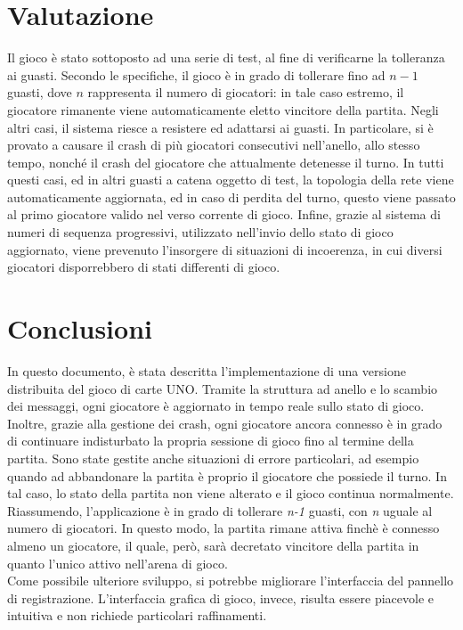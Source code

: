 \documentclass[11pt]{article} %
\begin{document}
\section{Valutazione}
Il gioco è stato sottoposto ad una serie di test, al fine di verificarne la tolleranza ai guasti. Secondo le specifiche, il gioco è in grado di tollerare fino ad \(n-1\) guasti, dove \(n\) rappresenta il numero di giocatori: in tale caso estremo, il giocatore rimanente viene automaticamente eletto vincitore della partita. \newline
Negli altri casi, il sistema riesce a resistere ed adattarsi ai guasti. In particolare, si è provato a causare il crash di più giocatori consecutivi nell'anello, allo stesso tempo, nonché il crash del giocatore che attualmente detenesse il turno. In tutti questi casi, ed in altri guasti a catena oggetto di test, la topologia della rete viene automaticamente aggiornata, ed in caso di perdita del turno, questo viene passato al primo giocatore valido nel verso corrente di gioco. \newline
Infine, grazie al sistema di numeri di sequenza progressivi, utilizzato nell'invio dello stato di gioco aggiornato, viene prevenuto l'insorgere di situazioni di incoerenza, in cui diversi giocatori disporrebbero di stati differenti di gioco.

\section{Conclusioni}
In questo documento, è stata descritta l'implementazione di una versione distribuita del gioco di carte UNO. Tramite la struttura ad anello e 
lo scambio dei messaggi, ogni giocatore è aggiornato in tempo reale sullo stato di gioco. 
Inoltre, grazie alla gestione dei crash, ogni giocatore ancora connesso è in grado di continuare indisturbato
la propria sessione di gioco fino al termine della partita. Sono state gestite anche situazioni di errore particolari, ad esempio quando ad abbandonare
la partita è proprio il giocatore che possiede il turno. In tal caso, lo stato della partita non viene alterato e il gioco continua normalmente. 
Riassumendo, l'applicazione è in grado di tollerare \emph{n-1} guasti, con \emph{n} uguale al numero di giocatori. In questo modo, la partita rimane attiva finchè è 
connesso almeno un giocatore, il quale, però, sarà decretato vincitore della partita in quanto l'unico attivo nell'arena di gioco.\\
Come possibile ulteriore sviluppo, si potrebbe migliorare l'interfaccia del pannello di registrazione.
L'interfaccia grafica di gioco, invece, risulta essere piacevole e intuitiva e non richiede particolari raffinamenti.  
\end{document}
